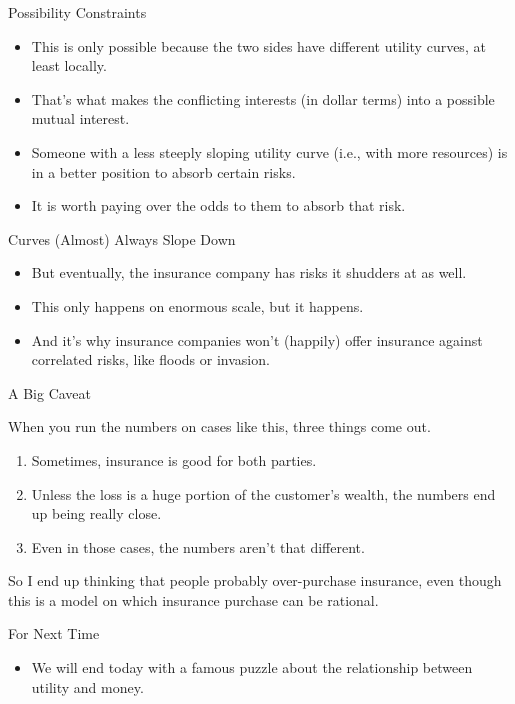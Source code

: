 \documentclass[
  ignorenonframetext,
]{beamer}
\providecommand{\tightlist}{%
  \setlength{\itemsep}{0pt}\setlength{\parskip}{0pt}}
\renewcommand{\,}{\text{, }}
\begin{document}
\begin{frame}{Possibility Constraints}
\protect\hypertarget{possibility-constraints}{}

\begin{itemize}
\tightlist
\item
  This is only possible because the two sides have different utility
  curves, at least locally.
\item
  That's what makes the conflicting interests (in dollar terms) into a
  possible mutual interest.
\item
  Someone with a less steeply sloping utility curve (i.e., with more
  resources) is in a better position to absorb certain risks.
\item
  It is worth paying over the odds to them to absorb that risk.
\end{itemize}

\end{frame}

\begin{frame}{Curves (Almost) Always Slope Down}
\protect\hypertarget{curves-almost-always-slope-down}{}

\begin{itemize}
\tightlist
\item
  But eventually, the insurance company has risks it shudders at as
  well.
\item
  This only happens on enormous scale, but it happens.
\item
  And it's why insurance companies won't (happily) offer insurance
  against correlated risks, like floods or invasion.
\end{itemize}

\end{frame}

\begin{frame}{A Big Caveat}
\protect\hypertarget{a-big-caveat}{}

When you run the numbers on cases like this, three things come out.

\begin{enumerate}
\tightlist
\item
  Sometimes, insurance is good for both parties. \pause
\item
  Unless the loss is a huge portion of the customer's wealth, the
  numbers end up being really close. \pause
\item
  Even in those cases, the numbers aren't that different.
\end{enumerate}

So I end up thinking that people probably over-purchase insurance, even
though this is a model on which insurance purchase can be rational.

\end{frame}

\begin{frame}{For Next Time}
\protect\hypertarget{for-next-time}{}

\begin{itemize}
\tightlist
\item
  We will end today with a famous puzzle about the relationship between
  utility and money.
\end{itemize}

\end{frame}
\end{document}
